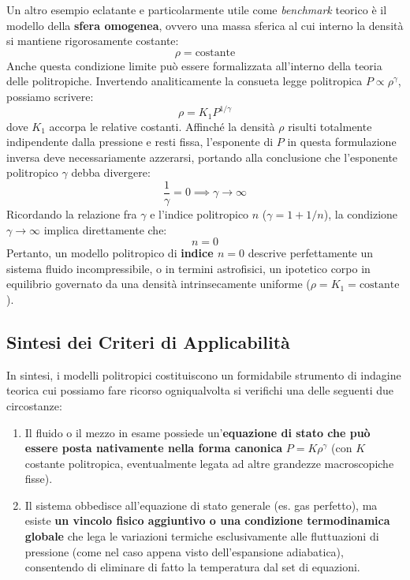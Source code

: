 Un altro esempio eclatante e particolarmente utile come \textit{benchmark} teorico è il modello della \textbf{sfera omogenea}, ovvero una massa sferica al cui interno la densità si mantiene rigorosamente costante:
\begin{equation}
\rho = \text{costante}
\end{equation}
Anche questa condizione limite può essere formalizzata all'interno della teoria delle politropiche. Invertendo analiticamente la consueta legge politropica $P \propto \rho^\gamma$, possiamo scrivere:
\begin{equation}
\rho = K_1 P^{1/\gamma}
\end{equation}
dove $K_1$ accorpa le relative costanti. Affinché la densità $\rho$ risulti totalmente indipendente dalla pressione e resti fissa, l'esponente di $P$ in questa formulazione inversa deve necessariamente azzerarsi, portando alla conclusione che l'esponente politropico $\gamma$ debba divergere:
\begin{equation}
\frac{1}{\gamma} = 0 \implies \gamma \to \infty
\end{equation}
Ricordando la relazione fra $\gamma$ e l'indice politropico $n$ ($\gamma = 1 + 1/n$), la condizione $\gamma \to \infty$ implica direttamente che:
\begin{equation}
n = 0
\end{equation}
Pertanto, un modello politropico di \textbf{indice $n = 0$} descrive perfettamente un sistema fluido incompressibile, o in termini astrofisici, un ipotetico corpo in equilibrio governato da una densità intrinsecamente uniforme ($\rho = K_1 = \text{costante}$).

\subsection{Sintesi dei Criteri di Applicabilità}

In sintesi, i modelli politropici costituiscono un formidabile strumento di indagine teorica cui possiamo fare ricorso ogniqualvolta si verifichi una delle seguenti due circostanze:
\begin{enumerate}
\item Il fluido o il mezzo in esame possiede un'\textbf{equazione di stato che può essere posta nativamente nella forma canonica} $P = K \rho^\gamma$ (con $K$ costante politropica, eventualmente legata ad altre grandezze macroscopiche fisse).
\item Il sistema obbedisce all'equazione di stato generale (es. gas perfetto), ma esiste \textbf{un vincolo fisico aggiuntivo o una condizione termodinamica globale} che lega le variazioni termiche esclusivamente alle fluttuazioni di pressione (come nel caso appena visto dell'espansione adiabatica), consentendo di eliminare di fatto la temperatura dal set di equazioni.
\end{enumerate}

